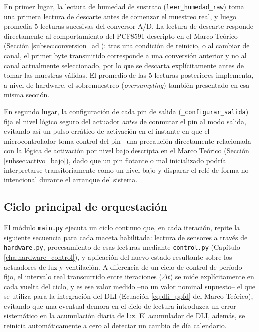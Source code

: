 En primer lugar, la lectura de humedad de sustrato (\texttt{leer\_humedad\_raw}) toma una primera lectura de descarte antes de comenzar el muestreo real, y luego promedia 5 lecturas sucesivas del conversor A/D. La lectura de descarte responde directamente al comportamiento del PCF8591 descripto en el Marco Teórico (Sección \ref{subsec:conversion_ad}): tras una condición de reinicio, o al cambiar de canal, el primer byte transmitido corresponde a una conversión anterior y no al canal actualmente seleccionado, por lo que se descarta explícitamente antes de tomar las muestras válidas. El promedio de las 5 lecturas posteriores implementa, a nivel de hardware, el sobremuestreo (\textit{oversampling}) también presentado en esa misma sección.

En segundo lugar, la configuración de cada pin de salida (\texttt{\_configurar\_salida}) fija el nivel lógico seguro del actuador \textit{antes} de conmutar el pin al modo salida, evitando así un pulso errático de activación en el instante en que el microcontrolador toma control del pin --una precaución directamente relacionada con la lógica de activación por nivel bajo descripta en el Marco Teórico (Sección \ref{subsec:activo_bajo}), dado que un pin flotante o mal inicializado podría interpretarse transitoriamente como un nivel bajo y disparar el relé de forma no intencional durante el arranque del sistema.

\subsection{Ciclo principal de orquestación}
\label{subsec:ciclo_orquestacion}

El módulo \texttt{main.py} ejecuta un ciclo continuo que, en cada iteración, repite la siguiente secuencia para cada maceta habilitada: lectura de sensores a través de \texttt{hardware.py}, procesamiento de esas lecturas mediante \texttt{control.py} (Capítulo \ref{cha:hardware_control}), y aplicación del nuevo estado resultante sobre los actuadores de luz y ventilación. A diferencia de un ciclo de control de período fijo, el intervalo real transcurrido entre iteraciones ($\Delta t$) se mide explícitamente en cada vuelta del ciclo, y es ese valor medido --no un valor nominal supuesto-- el que se utiliza para la integración del DLI (Ecuación \ref{eq:dli_ppfd} del Marco Teórico), evitando que una eventual demora en el ciclo de lectura introduzca un error sistemático en la acumulación diaria de luz. El acumulador de DLI, además, se reinicia automáticamente a cero al detectar un cambio de día calendario.

